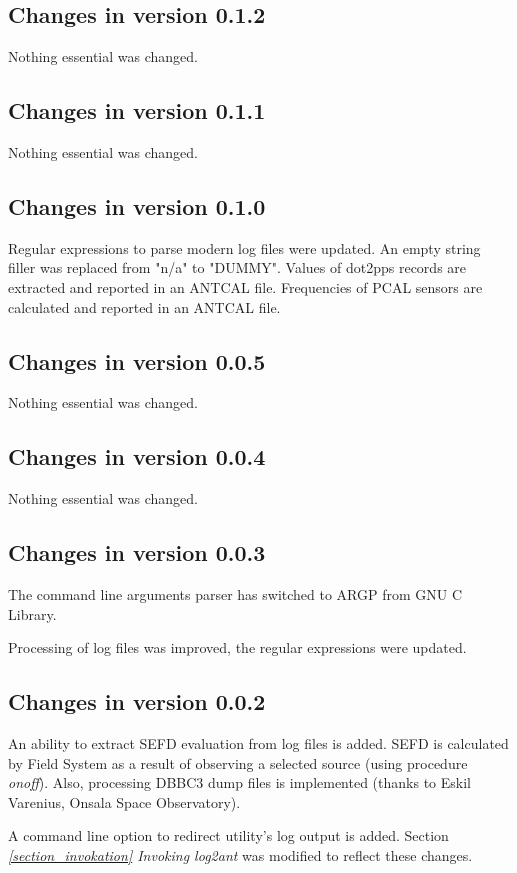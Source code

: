\documentclass [10pt,letterpaper]{report}
\begin{document}
\subsection{Changes in version 0.1.2}
Nothing essential was changed.

\subsection{Changes in version 0.1.1}
Nothing essential was changed.

\subsection{Changes in version 0.1.0}
Regular expressions to parse modern log files were updated. An empty string filler was
replaced from "n/a" to "DUMMY".
Values of dot2pps records are extracted and reported in an ANTCAL file.
Frequencies of PCAL sensors are calculated and reported in an ANTCAL file.

\subsection{Changes in version 0.0.5}
Nothing essential was changed.

\subsection{Changes in version 0.0.4}
Nothing essential was changed.

\subsection{Changes in version 0.0.3}

The command line arguments parser has switched to ARGP from GNU C Library.

Processing of log files was improved, the regular expressions were updated.


\subsection{Changes in version 0.0.2}
An ability to extract SEFD evaluation from log files is added. SEFD is calculated
by Field System as a result of observing a selected source (using procedure {\it onoff}).
Also, processing DBBC3 dump files is implemented (thanks to Eskil Varenius, Onsala Space Observatory).

A command line option to redirect utility's log output is added.
Section \emph{\ref{section_invokation} Invoking log2ant} was modified to reflect
these changes.
\end{document}
